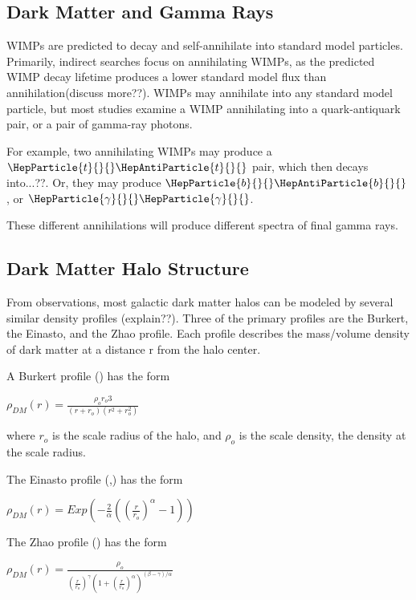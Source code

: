 
\subsection{Dark Matter and Gamma Rays}

WIMPs are predicted to decay and self-annihilate into standard model particles.
Primarily, indirect searches focus on annihilating WIMPs, as the predicted WIMP decay lifetime produces a lower standard model flux than annihilation(discuss more??).
WIMPs may annihilate into any standard model particle, but most studies examine a WIMP annihilating into a quark-antiquark pair, or a pair of gamma-ray photons.

For example, two annihilating WIMPs may produce a $\HepParticle{t}{}{}\HepAntiParticle{t}{}{}$ pair, which then decays into...??.
Or, they may produce $\HepParticle{b}{}{}\HepAntiParticle{b}{}{}$, or $\HepParticle{\gamma}{}{}\HepParticle{\gamma}{}{}$.

These different annihilations will produce different spectra of final gamma rays.

\subsection{Dark Matter Halo Structure}

From observations, most galactic dark matter halos can be modeled by several similar density profiles (explain??).
Three of the primary profiles are the Burkert, the Einasto, and the Zhao profile.
Each profile describes the mass/volume density of dark matter at a distance r from the halo center.

A Burkert profile (\cite{burkertprofile}) has the form

$ \rho_{DM} \left( r \right) = \frac{ \rho_o r_o3}{ \left( r + r_o \right) \left( r^2 + r_o^2 \right)} $ \label{eqn:burkert}

where $r_o$ is the scale radius of the halo, and $\rho_o$ is the scale density, the density at the scale radius.

The Einasto profile (\cite{einastoprofile1},\cite{einastoprofile2}) has the form

$ \rho_{DM} \left( r \right) = Exp \left( - \frac{2}{\alpha} \left( {\left( \frac{r}{r_o} \right)}^{\alpha} - 1 \right) \right)$ \label{eqn:einasto}

The Zhao profile (\cite{zhaoprofile}) has the form

$ \rho_{DM} \left( r \right) = \frac{\rho_o}{ {\left( \frac{r}{r_o} \right)}^{\gamma} {\left( 1 + {\left( \frac{r}{r_o} \right)}^{\alpha} \right)}^{ \left(\beta - \gamma \right) / \alpha} } $ \label{eqn:zhao}

